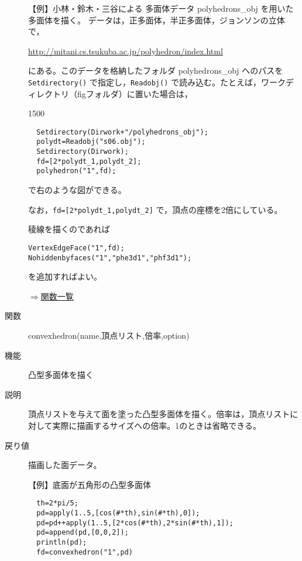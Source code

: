 \documentclass[papersize,a4paper,12pt,uplatex]{jsarticle}
\begin{document}
\begin{description}
【例】小林・鈴木・三谷による 多面体データ polyhedrons\_obj を用いた多面体を描く。 
 データは，正多面体，半正多面体，ジョンソンの立体で，
 
\url{http://mitani.cs.tsukuba.ac.jp/polyhedron/index.html }
 
 にある。このデータを格納したフォルダ polyhedrons\_obj へのパスを \verb|Setdirectory()| で指定し，\verb|Readobj()| で読み込む。たとえば，ワークディレクトリ（figフォルダ）に置いた場合は， 
 
\begin{layer}{150}{0}
\end{layer}

\begin{verbatim}
  Setdirectory(Dirwork+"/polyhedrons_obj");
  polydt=Readobj("s06.obj");
  Setdirectory(Dirwork);
  fd=[2*polydt_1,polydt_2];
  polyhedron("1",fd);
\end{verbatim}
で右のような図ができる。

なお，\verb|fd=[2*polydt_1,polydt_2]| で，頂点の座標を2倍にしている。

稜線を描くのであれば 

\begin{verbatim}
VertexEdgeFace("1",fd);
Nohiddenbyfaces("1","phe3d1","phf3d1");
\end{verbatim}
を追加すればよい。

\begin{flushright} \hyperlink{functionlist}{$\Rightarrow$関数一覧}\end{flushright}

\hypertarget{convexhedron}{}
\item[関数] convexhedron(name,頂点リスト,倍率,option)
\item[機能] 凸型多面体を描く
\item[説明] 頂点リストを与えて面を塗った凸型多面体を描く。倍率は，頂点リストに対して実際に描画するサイズへの倍率。1のときは省略できる。
\item[戻り値] 描画した面データ。

\vspace{\baselineskip}
【例】底面が五角形の凸型多面体
\begin{verbatim}
  th=2*pi/5;
  pd=apply(1..5,[cos(#*th),sin(#*th),0]);
  pd=pd++apply(1..5,[2*cos(#*th),2*sin(#*th),1]);
  pd=append(pd,[0,0,2]);
  println(pd);
  fd=convexhedron("1",pd)
\end{verbatim}
\hspace{20mm}


\end{description}
\end{document}
